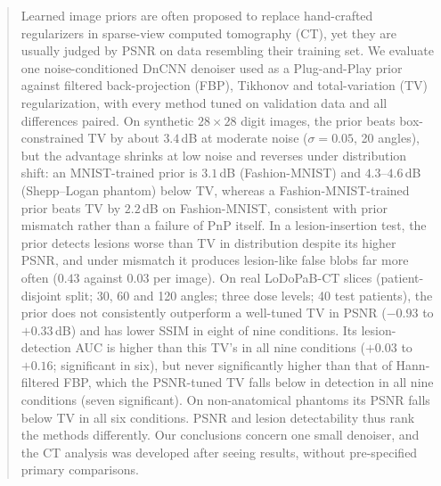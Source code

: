 \begin{abstract}
Learned image priors are often proposed to replace hand-crafted regularizers in sparse-view computed tomography (CT), yet they are usually judged by PSNR on data resembling their training set. We evaluate one noise-conditioned DnCNN denoiser used as a Plug-and-Play prior against filtered back-projection (FBP), Tikhonov and total-variation (TV) regularization, with every method tuned on validation data and all differences paired. On synthetic $28\times 28$ digit images, the prior beats box-constrained TV by about $3.4$\,dB at moderate noise ($\sigma=0.05$, 20 angles), but the advantage shrinks at low noise and reverses under distribution shift: an MNIST-trained prior is $3.1$\,dB (Fashion-MNIST) and $4.3$--$4.6$\,dB (Shepp--Logan phantom) below TV, whereas a Fashion-MNIST-trained prior beats TV by $2.2$\,dB on Fashion-MNIST, consistent with prior mismatch rather than a failure of PnP itself. In a lesion-insertion test, the prior detects lesions worse than TV in distribution despite its higher PSNR, and under mismatch it produces lesion-like false blobs far more often ($0.43$ against $0.03$ per image). On real LoDoPaB-CT slices (patient-disjoint split; 30, 60 and 120 angles; three dose levels; 40 test patients), the prior does not consistently outperform a well-tuned TV in PSNR ($-0.93$ to $+0.33$\,dB) and has lower SSIM in eight of nine conditions. Its lesion-detection AUC is higher than this TV's in all nine conditions ($+0.03$ to $+0.16$; significant in six), but never significantly higher than that of Hann-filtered FBP, which the PSNR-tuned TV falls below in detection in all nine conditions (seven significant). On non-anatomical phantoms its PSNR falls below TV in all six conditions. PSNR and lesion detectability thus rank the methods differently. Our conclusions concern one small denoiser, and the CT analysis was developed after seeing results, without pre-specified primary comparisons.
\end{abstract}

